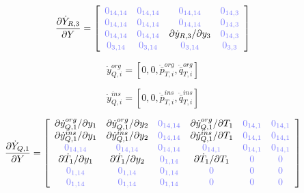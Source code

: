 \documentclass[a4paper,10pt]{article}
\begin{document}
\begin{equation}
\frac{\partial\dot{Y}_{R,3}}{\partial Y}=
\left[ \begin{array}{cccc}
\zm{14,14} & \zm{14,14} & \zm{14,14}                            & \zm{14,3}\\
\zm{14,14} & \zm{14,14} & \zm{14,14}                            & \zm{14,3}\\
\zm{14,14} & \zm{14,14} & \partial \dot{y}_{R,3} / \partial y_3 & \zm{14,3}\\
\zm{3,14}  & \zm{3,14}  & \zm{3,14}                             & \zm{3,3}\\
\end{array}  \right]
\end{equation}


\begin{equation}
\dot{y}_{Q,i}^{org} = [0, 0, \ddot{\bar{p}}_{T,i}^{org}, \ddot{\bar{q}}_{T,i}^{org}]
\end{equation}

\begin{equation}
\dot{y}_{Q,i}^{ins} = [0, 0, \ddot{\bar{p}}_{T,i}^{ins}, \ddot{\bar{q}}_{T,i}^{ins}]
\end{equation}

\begin{equation}
\frac{\partial\dot{Y}_{Q,1}}{\partial Y}=
\left[ \begin{array}{cccccc}
\partial\dot{y}_{Q,1}^{org} / \partial y_1 & \partial\dot{y}_{Q,1}^{org} / \partial y_2 & \zm{14,14} & \partial\dot{y}_{Q,1}^{org} / \partial T_1 & \zm{14,1} & \zm{14,1} \\
\partial\dot{y}_{Q,1}^{ins} / \partial y_1 & \partial\dot{y}_{Q,1}^{ins} / \partial y_2 & \zm{14,14} & \partial\dot{y}_{Q,1}^{ins} / \partial T_1 & \zm{14,1} & \zm{14,1} \\
\zm{14,14}                                 & \zm{14,14}                                 & \zm{14,14} & \zm{14,1}                                  & \zm{14,1} & \zm{14,1} \\
\partial\dot{T}_1 / \partial y_1           & \partial\dot{T}_1 / \partial y_2           & \zm{1,14}  & \partial\dot{T}_1 / \partial T_1           & \zm{}     & \zm{} \\
\zm{1,14}                                  & \zm{1,14}                                  & \zm{1,14}  & \zm{}                                      & \zm{}     & \zm{} \\
\zm{1,14}                                  & \zm{1,14}                                  & \zm{1,14}  & \zm{}                                      & \zm{}     & \zm{} \\
\end{array}  \right]
\end{equation}
\end{document}
